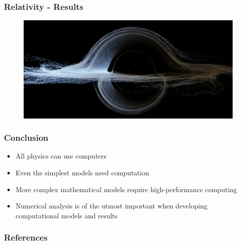 \documentclass{beamer}
\begin{document}
\begin{frame}
    \frametitle{Relativity - Results}

    \begin{figure}
        \centering
        \includegraphics[width=\textwidth]{images/gargantua.png}
    \end{figure}

\end{frame}

\begin{frame}
    \frametitle{Conclusion}

    \begin{itemize}
        \item All physics can use computers
        \item Even the simplest models need computation
        \item More complex mathematical models require high-performance computing
        \item Numerical analysis is of the utmost important when developing computational models and results
    \end{itemize}

\end{frame}

    
    
    
    

\nocite{*}
\begin{frame}[allowframebreaks]
\frametitle{References}
\printbibliography
\end{frame}
\end{document}
